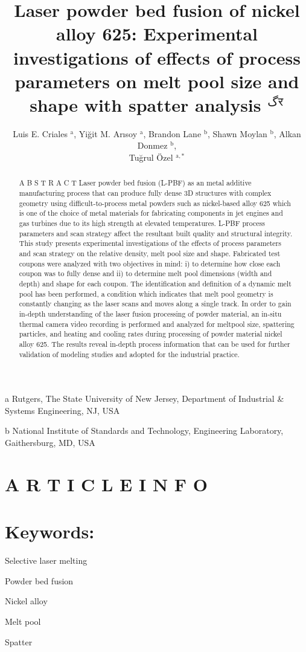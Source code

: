 \documentclass[10pt]{article}
\title{Laser powder bed fusion of nickel alloy 625: Experimental investigations of effects of process parameters on melt pool size and shape with spatter analysis $^{\text {گर}}$ }
\author{Luis E. Criales ${ }^{\mathrm{a}}$, Yiğit M. Arısoy ${ }^{\mathrm{a}}$, Brandon Lane ${ }^{\mathrm{b}}$, Shawn Moylan ${ }^{\mathrm{b}}$, Alkan Donmez ${ }^{\mathrm{b}}$,\\
Tuğrul Özel ${ }^{\mathrm{a}, *}$}
\date{}
\begin{document}
\maketitle
a Rutgers, The State University of New Jersey, Department of Industrial \& Systems Engineering, NJ, USA

b National Institute of Standards and Technology, Engineering Laboratory, Gaithersburg, MD, USA

\section*{A R T I C L E I N F O}
\section*{Keywords:}
Selective laser melting

Powder bed fusion

Nickel alloy

Melt pool

Spatter

\begin{abstract}
A B S T R A C T Laser powder bed fusion (L-PBF) as an metal additive manufacturing process that can produce fully dense 3D structures with complex geometry using difficult-to-process metal powders such as nickel-based alloy 625 which is one of the choice of metal materials for fabricating components in jet engines and gas turbines due to its high strength at elevated temperatures. L-PBF process parameters and scan strategy affect the resultant built quality and structural integrity. This study presents experimental investigations of the effects of process parameters and scan strategy on the relative density, melt pool size and shape. Fabricated test coupons were analyzed with two objectives in mind: i) to determine how close each coupon was to fully dense and ii) to determine melt pool dimensions (width and depth) and shape for each coupon. The identification and definition of a dynamic melt pool has been performed, a condition which indicates that melt pool geometry is constantly changing as the laser scans and moves along a single track. In order to gain in-depth understanding of the laser fusion processing of powder material, an in-situ thermal camera video recording is performed and analyzed for meltpool size, spattering particles, and heating and cooling rates during processing of powder material nickel alloy 625. The results reveal in-depth process information that can be used for further validation of modeling studies and adopted for the industrial practice.
\end{abstract}
\end{document}
